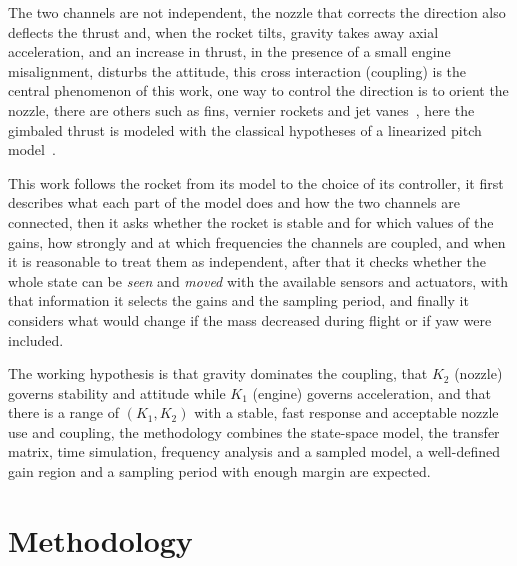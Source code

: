 \documentclass[article, 11pt]{IEEEtran}   %
\begin{document}
The two channels are not independent, the nozzle that corrects the direction also deflects the thrust and, when the rocket tilts, gravity takes away axial acceleration, and an increase in thrust, in the presence of a small engine misalignment, disturbs the attitude, this cross interaction (coupling) is the central phenomenon of this work, one way to control the direction is to orient the nozzle, there are others such as fins, vernier rockets and jet vanes~\cite{nasa}, here the gimbaled thrust is modeled with the classical hypotheses of a linearized pitch model~\cite{wie,greensite}.

This work follows the rocket from its model to the choice of its controller, it first describes what each part of the model does and how the two channels are connected, then it asks whether the rocket is stable and for which values of the gains, how strongly and at which frequencies the channels are coupled, and when it is reasonable to treat them as independent, after that it checks whether the whole state can be \emph{seen} and \emph{moved} with the available sensors and actuators, with that information it selects the gains and the sampling period, and finally it considers what would change if the mass decreased during flight or if yaw were included.


The working hypothesis is that gravity dominates the coupling, that $K_2$ (nozzle) governs stability and attitude while $K_1$ (engine) governs acceleration, and that there is a range of $(K_1,K_2)$ with a stable, fast response and acceptable nozzle use and coupling, the methodology combines the state-space model, the transfer matrix, time simulation, frequency analysis and a sampled model, a well-defined gain region and a sampling period with enough margin are expected.

\section{Methodology}
\end{document}
